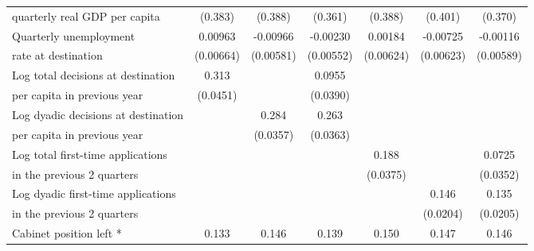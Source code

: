 \begin{table}[htbp]
\begin{tabular}{l*{6}{c}}
 quarterly real GDP per capita                    &     (0.383)         &     (0.388)         &     (0.361)         &     (0.388)         &     (0.401)         &     (0.370)         \\
[0,5em]
Quarterly unemployment&     0.00963         &    -0.00966         &    -0.00230         &     0.00184         &    -0.00725         &    -0.00116         \\
 rate at destination                    &   (0.00664)         &   (0.00581)         &   (0.00552)         &   (0.00624)         &   (0.00623)         &   (0.00589)         \\
[0,5em]
Log total decisions at destination&       0.313\sym{***}&                     &      0.0955\sym{*}  &                     &                     &                      \\
 per capita in previous year                   &    (0.0451)         &                     &    (0.0390)         &                     &                     &                     \\
[0,5em]
Log dyadic decisions at destination&                     &       0.284\sym{***}&       0.263\sym{***}&                     &                     &                     \\
  per capita in previous year                   &                     &    (0.0357)         &    (0.0363)         &                     &                     &                     \\
[0,5em]
Log total first-time applications&                     &                     &                     &       0.188\sym{***}&                     &      0.0725\sym{*}  \\
 in the previous 2 quarters                    &                     &                     &                     &    (0.0375)         &                     &    (0.0352)         \\
[0,5em]
Log dyadic first-time applications&                     &                     &                     &                     &       0.146\sym{***}&       0.135\sym{***}\\
  in the previous 2 quarters                   &                     &                     &                     &                     &    (0.0204)         &    (0.0205)         \\
[0,5em]
Cabinet position left *&       0.133\sym{***}&       0.146\sym{***}&       0.139\sym{***}&       0.150\sym{***}&       0.147\sym{***}&       0.146\sym{***}\\

\end{tabular}
\end{table}
